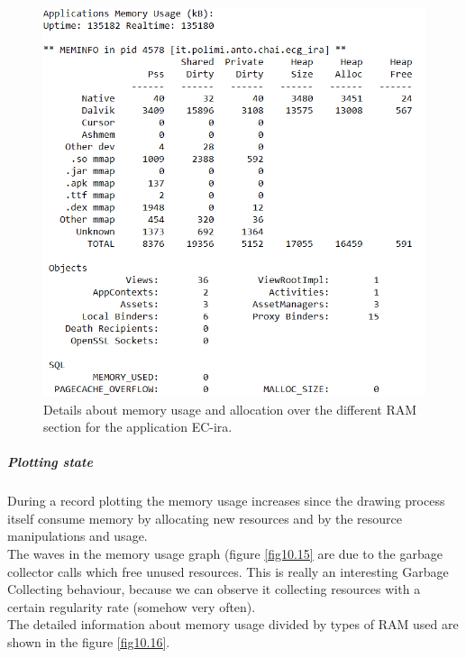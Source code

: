 \begin{figure}[ht]
	\centering	
	\includegraphics[width=0.6\linewidth]{figures/ch10/14.png}
	\caption{Details about memory usage and allocation over the different RAM section for the application EC-ira.}  
	\label{fig10.14}
\end{figure}
\subparagraph{Plotting state}
During a record plotting the memory usage increases since the drawing process itself consume memory by allocating new resources and by the resource manipulations and usage.\\
The waves in the memory usage graph (figure \ref{fig10.15} are due to the garbage collector calls which free unused resources. This is really an interesting  Garbage Collecting behaviour, because we can observe it collecting resources with a certain regularity rate (somehow very often).\\
The detailed information about memory usage divided by types of RAM used are shown in the figure \ref{fig10.16}.
